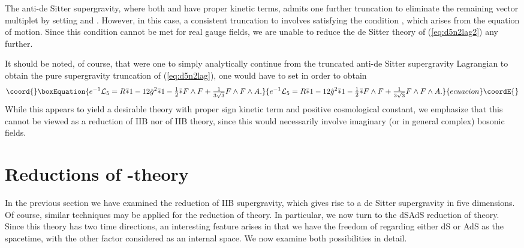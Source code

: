\documentclass[a4paper,12pt]{article}
\providecommand{\ft}[2]{{\textstyle\frac{#1}{#2}}}
\begin{document}
The anti-de Sitter supergravity, where both \coordHE{} and \coordHE{} have
proper kinetic terms, admits one further truncation to eliminate the
remaining vector multiplet by setting \coordHE{} and \coordHE{}.  However, in this case, a consistent truncation to \coordHE{}
involves satisfying the condition \coordHE{}, which arises from the \myHighlight{$\varphi$}\coordHE{} equation of motion.  Since
this condition cannot be met for real gauge fields, we are unable to
reduce the de Sitter theory of (\ref{eq:d5n2lag2}) any further.

It should be noted, of course, that were one to simply analytically
continue from the truncated \coordHE{} anti-de Sitter supergravity Lagrangian
to obtain the pure supergravity truncation of (\ref{eq:d5n2lag}), one
would have to set \coordHE{} in order to obtain 
%
\begin{equation}\coord{}\boxEquation{
e^{-1}{\cal L}_5=R\bar*1-12\hat g^2\bar*1
-\ft12\bar*F\wedge F+\ft1{3\sqrt{3}}F\wedge F\wedge A.
}{
e^{-1}{\cal L}_5=R\bar*1-12\hat g^2\bar*1
-\ft12\bar*F\wedge F+\ft1{3\sqrt{3}}F\wedge F\wedge A.
}{ecuacion}\coordE{}\end{equation}
%
While this appears to yield a desirable theory with proper sign kinetic
term and positive cosmological constant, we emphasize that this cannot
be viewed as a reduction of IIB nor of IIB\myHighlight{$^*$}\coordHE{} theory, since this would
necessarily involve imaginary (or in general complex) bosonic fields.


\section{Reductions of \coordHE{}-theory}

In the previous section we have examined the \coordHE{} reduction of IIB\myHighlight{$^*$}\coordHE{}
supergravity, which gives rise to a de Sitter supergravity in five
dimensions.  Of course, similar techniques may be applied for the reduction
of \coordHE{} theory.  In particular, we now turn to the dS\myHighlight{$_4\times$}\coordHE{}AdS\coordHE{}
reduction of \coordHE{} theory.  Since this theory has two time
directions, an interesting feature arises in that we have the freedom of
regarding either dS\coordHE{} or AdS\coordHE{} as the spacetime, with the other factor
considered as an internal space.  We now examine both possibilities
in detail.
\end{document}
